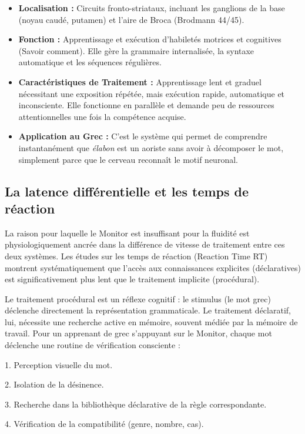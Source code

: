 \begin{itemize}\item \textbf{Localisation :} Circuits fronto-striataux, incluant les ganglions de la base (noyau caudé, putamen) et l'aire de Broca (Brodmann 44/45).\item \textbf{Fonction :} Apprentissage et exécution d'habiletés motrices et cognitives (\og Savoir comment\fg{}). Elle gère la grammaire internalisée, la syntaxe automatique et les séquences régulières.\item \textbf{Caractéristiques de Traitement :} Apprentissage lent et graduel nécessitant une exposition répétée, mais exécution rapide, automatique et inconsciente. Elle fonctionne en parallèle et demande peu de ressources attentionnelles une fois la compétence acquise.\item \textbf{Application au Grec :} C'est le système qui permet de comprendre instantanément que \textit{élabon} est un aoriste sans avoir à décomposer le mot, simplement parce que le cerveau reconnaît le \og motif\fg{} neuronal.\end{itemize}

\subsection{La latence différentielle et les temps de réaction}

La raison pour laquelle le Monitor est \og insuffisant pour la fluidité\fg{} est physiologiquement
ancrée dans la différence de vitesse de traitement entre ces deux systèmes. Les études sur les temps
de réaction (Reaction Time \- RT) montrent systématiquement que l'accès aux connaissances explicites
(déclaratives) est significativement plus lent que le traitement implicite
(procédural).\cite{II-2-3-ref17}

Le traitement procédural est un réflexe cognitif : le stimulus (le mot grec) déclenche directement
la représentation grammaticale. Le traitement déclaratif, lui, nécessite une recherche active en
mémoire, souvent médiée par la mémoire de travail. Pour un apprenant de grec s'appuyant sur le
Monitor, chaque mot déclenche une routine de vérification consciente :

1. Perception visuelle du mot.

2. Isolation de la désinence.

3. Recherche dans la \og bibliothèque\fg{} déclarative de la règle correspondante.

4. Vérification de la compatibilité (genre, nombre, cas).

